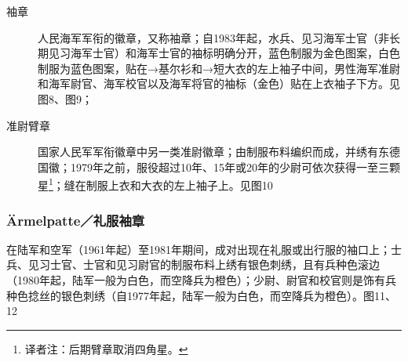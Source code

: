 \begin{description}

    \item[袖章] 人民海军军衔的徽章，又称袖章；自1983年起，水兵、见习海军士官（非长期见习海军士官）和海军士官的袖标明确分开，蓝色制服为金色图案，白色制服为蓝色图案，贴在→基尔衫和→短大衣的左上袖子中间，男性海军准尉和海军尉官、海军校官以及海军将官的袖标（金色）贴在上衣袖子下方。见图8、图9；

    \item[准尉臂章] 国家人民军军衔徽章中另一类准尉徽章；由制服布料编织而成，并绣有东德国徽；1979年之前，服役超过10年、15年或20年的少尉可依次获得一至三颗星\footnote{译者注：后期臂章取消四角星。\cite{clarionv}}；缝在制服上衣和大衣的左上袖子上。见图10 

\end{description}

\subsubsection*{Ärmelpatte／礼服袖章}

在陆军和空军（1961年起）至1981年期间，成对出现在礼服或出行服的袖口上；士兵、见习士官、士官和见习尉官的制服布料上绣有银色刺绣，且有兵种色滚边（1980年起，陆军一般为白色，而空降兵为橙色）；少尉、尉官和校官则是饰有兵种色捻丝的银色刺绣（自1977年起，陆军一般为白色，而空降兵为橙色）。图11、12

